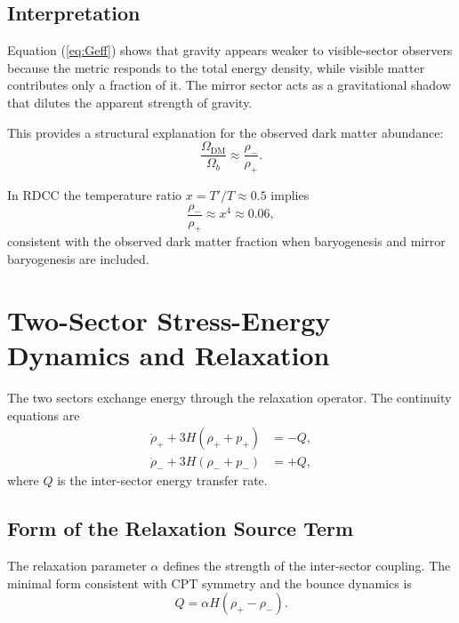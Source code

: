 \documentclass[11pt,a4paper]{article}
\begin{document}
\subsection{Interpretation}

Equation (\ref{eq:Geff}) shows that gravity appears weaker to visible-sector observers because the metric responds to the total energy density, while visible matter contributes only a fraction of it. The mirror sector acts as a gravitational shadow that dilutes the apparent strength of gravity.

This provides a structural explanation for the observed dark matter abundance:
\begin{equation}
\frac{\Omega_{\mathrm{DM}}}{\Omega_b} \approx \frac{\rho_-}{\rho_+}.
\end{equation}

In RDCC the temperature ratio $x = T'/T \approx 0.5$ implies
\begin{equation}
\frac{\rho_-}{\rho_+} \approx x^4 \approx 0.06,
\end{equation}
consistent with the observed dark matter fraction when baryogenesis and mirror baryogenesis are included.

\section{Two-Sector Stress-Energy Dynamics and Relaxation}

The two sectors exchange energy through the relaxation operator. The continuity equations are
\begin{align}
\dot{\rho}_+ + 3H(\rho_+ + p_+) &= -Q, \\
\dot{\rho}_- + 3H(\rho_- + p_-) &= +Q,
\end{align}
where $Q$ is the inter-sector energy transfer rate.

\subsection{Form of the Relaxation Source Term}

The relaxation parameter $\alpha$ defines the strength of the inter-sector coupling. The minimal form consistent with CPT symmetry and the bounce dynamics is
\begin{equation}
Q = \alpha H (\rho_+ - \rho_-).
\label{eq:Q}
\end{equation}
\end{document}
